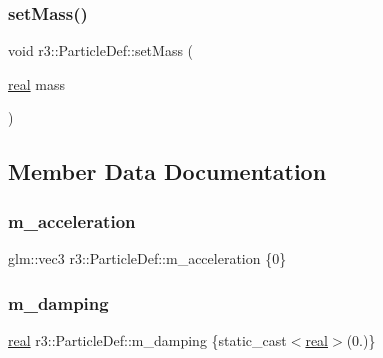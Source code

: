 \mbox{\label{structr3_1_1_particle_def_a89966eea5b3ef424f105626dedb266e1}} 
\subsubsection{\texorpdfstring{set\+Mass()}{setMass()}}
{\footnotesize\ttfamily void r3\+::\+Particle\+Def\+::set\+Mass (\begin{DoxyParamCaption}\item[{\mbox{\hyperlink{namespacer3_ab2016b3e3f743fb735afce242f0dc1eb}{real}}}]{mass }\end{DoxyParamCaption})}



\subsection{Member Data Documentation}
\mbox{\label{structr3_1_1_particle_def_a231397eab290672708245641223a7cc9}} 
\subsubsection{\texorpdfstring{m\+\_\+acceleration}{m\_acceleration}}
{\footnotesize\ttfamily glm\+::vec3 r3\+::\+Particle\+Def\+::m\+\_\+acceleration \{0\}}

\mbox{\label{structr3_1_1_particle_def_a76008c519d8c2fd21b7c866708dceb5c}} 
\subsubsection{\texorpdfstring{m\+\_\+damping}{m\_damping}}
{\footnotesize\ttfamily \mbox{\hyperlink{namespacer3_ab2016b3e3f743fb735afce242f0dc1eb}{real}} r3\+::\+Particle\+Def\+::m\+\_\+damping \{static\+\_\+cast$<$\mbox{\hyperlink{namespacer3_ab2016b3e3f743fb735afce242f0dc1eb}{real}}$>$(0.)\}}

